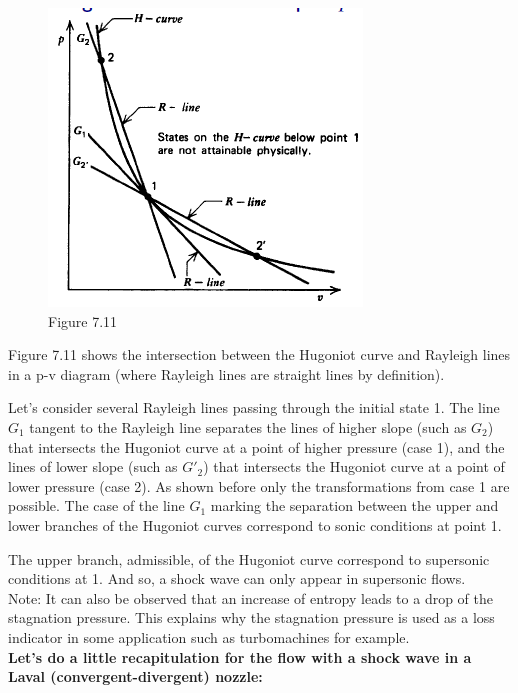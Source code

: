 \begin{figure}[H]
\begin{center}
\includegraphics[scale=0.5]{ch7/chap710.png}
\caption*{Figure 7.11}
\end{center}
\end{figure}


Figure 7.11 shows the intersection between the Hugoniot curve and Rayleigh lines in a p-v diagram (where Rayleigh lines are straight lines by definition). 

Let's consider several Rayleigh lines passing through the initial state 1. The line $G_1$ tangent to the Rayleigh line separates the lines of higher slope (such as $G_2$) that intersects the Hugoniot curve at a point of higher pressure (case 1), and the lines of lower slope (such as $G'_2$) that intersects the Hugoniot curve at a point of lower pressure (case 2). As shown before only the transformations from case 1 are possible. The case of the line $G_1$ marking the separation between the upper and lower branches of the Hugoniot curves correspond to sonic conditions at point 1. 

The upper branch, admissible, of the Hugoniot curve correspond to supersonic conditions at 1. And so, a shock wave can only appear in supersonic flows.
\\

Note: It can also be observed that an increase of entropy leads to a drop of the stagnation pressure. This explains why the stagnation pressure is used as a loss indicator in some application such as turbomachines for example.
\\

\textbf{Let's do a little recapitulation for the flow with a shock wave in a Laval (convergent-divergent) nozzle:}
\\

